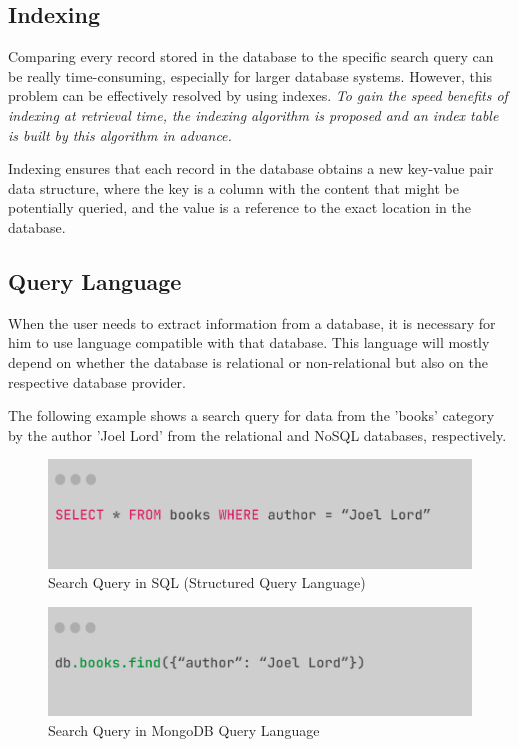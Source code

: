 \documentclass[12pt, a4paper]{article}
\begin{document}
    \subsection{Indexing}
        Comparing every record stored in the database to the specific search query can be really time-consuming, especially for larger database systems. However, this problem can be effectively resolved by using indexes. \textit{To gain the speed benefits of indexing at retrieval time, the indexing algorithm is proposed and an index table is built by this algorithm in advance.}\cite{15}\par Indexing ensures that each record in the database obtains a new key-value pair data structure, where the key is a column with the content that might be potentially queried, and the value is a reference to the exact location in the database.
    
    \subsection{Query Language}
        When the user needs to extract information from a database, it is necessary for him to use language compatible with that database. This language will mostly depend on whether the database is relational or non-relational but also on the respective database provider.\par The following example shows a search query for data from the 'books' category by the author 'Joel Lord' from the relational and NoSQL databases, respectively.
    \clearpage

    \begin{figure}[h]
        \centering
        \includegraphics[width=0.9\linewidth]{images/sql.png}
        \caption{Search Query in SQL (Structured Query Language) \cite{101}}
        \label{fig:sql}
    \end{figure}

    \begin{figure}[h]
        \centering
        \includegraphics[width=0.9\linewidth]{images/mongodb.png}
        \caption{Search Query in MongoDB Query Language \cite{101}}
        \label{fig:mongodb}
    \end{figure}
\clearpage
\end{document}
